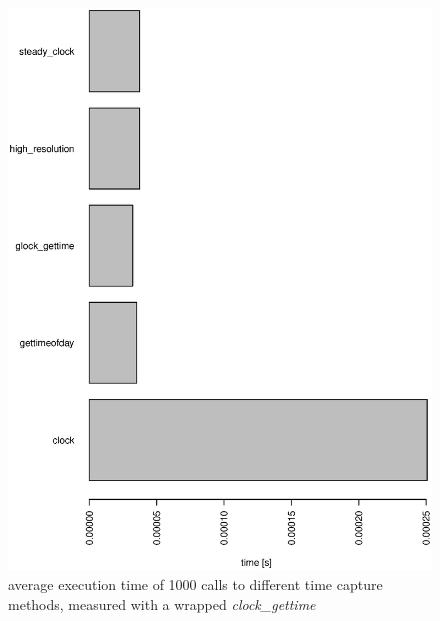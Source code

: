 \begin{figure}[H]
  \centering 
  \includegraphics[height=0.93\textheight]{pictures/timer_benchmarks.eps}
  \caption{average execution time of 1000 calls to different time capture methods, measured with a wrapped \textit{clock\_gettime}}
  \label{timer_benchmark}
\end{figure}

